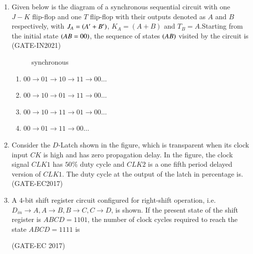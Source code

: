\begin{enumerate}
 \item Given below is the diagram of a synchronous sequential circuit with one $J-K$ flip-flop and one $T$ flip-flop with their outputs denoted as $A$ and $B$ respectively, with $J_{A}=\left(A^{\prime}+B^{\prime}\right)$, $K_{A}=(A+B)$ and $T_{B}=A$.Starting from the initial state $\left(AB=00\right)$, the sequence of states $\left(AB\right)$ visited by the circuit is
\hfill(GATE-IN2021)
	      \begin{figure}[H]
		      \centering
		      
		      \caption{synchronous}
		      \label{}
	      \end{figure}
		  \begin{enumerate}
          \item $00 \rightarrow 01 \rightarrow 10 \rightarrow 11 \rightarrow 00 
          \dots $
          \item $00 \rightarrow 10 \rightarrow 01 \rightarrow 11 \rightarrow 00 
          \dots $
          \item $00 \rightarrow 10 \rightarrow 11 \rightarrow 01 \rightarrow 00 \dots $
          \item $00 \rightarrow 01 \rightarrow 11 \rightarrow 00 \dots $
      \end{enumerate}
  \item Consider the $D$-Latch shown in the figure, which is transparent when its clock input $CK$ is high and has zero propagation delay. In the figure, the clock signal $CLK1$ has $50\%$ duty cycle and $CLK2$ is a one fifth period delayed version of $CLK1$. The duty cycle at the output of the latch in percentage is.
  \hfill(GATE-EC2017)
	      \begin{figure}[h!]
		      \begin{center}
			      
			      \caption{}
		      \end{center}
	      \end{figure}
\item A $4$-bit shift register circuit configured for right-shift operation, i.e.\\ $D_{in} \rightarrow A, A \rightarrow B, B \rightarrow C, C \rightarrow D$, is shown. If the present state of the shift register is $ABCD = 1101$, the number of clock cycles required to reach the state $ABCD = 1111$ is

\hfill (GATE-EC 2017)
\begin{figure}[H]
    \centering
	
 	\caption{}
\end{figure}


\end{enumerate}
